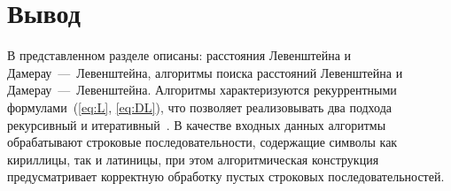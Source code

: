 \section*{Вывод}

В представленном разделе описаны: расстояния Левенштейна и Дамерау~---~Левенштейна, алгоритмы поиска расстояний Левенштейна и Дамерау~---~Левенштейна. Алгоритмы характеризуются рекуррентными формулами~(\ref{eq:L}, \ref{eq:DL}), что позволяет реализовывать два подхода рекурсивный и итеративный~\cite{analysis-lev-damlev}. 
В качестве входных данных алгоритмы обрабатывают строковые последовательности, содержащие символы как кириллицы, так и латиницы, при этом алгоритмическая конструкция предусматривает корректную обработку пустых строковых последовательностей.
